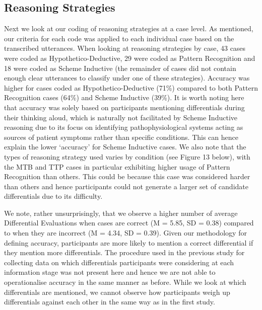 \documentclass[a4paper, nobind]{templates/ociamthesis}
\begin{document}
\hypertarget{reasoning-strategies}{%
\subsection*{Reasoning Strategies}\label{reasoning-strategies}}

Next we look at our coding of reasoning strategies at a case level. As mentioned, our criteria for each code was applied to each individual case based on the transcribed utterances. When looking at reasoning strategies by case, 43 cases were coded as Hypothetico-Deductive, 29 were coded as Pattern Recognition and 18 were coded as Scheme Inductive (the remainder of cases did not contain enough clear utterances to classify under one of these strategies). Accuracy was higher for cases coded as Hypothetico-Deductive (71\%) compared to both Pattern Recognition cases (64\%) and Scheme Inductive (39\%). It is worth noting here that accuracy was solely based on participants mentioning differentials during their thinking aloud, which is naturally not facilitated by Scheme Inductive reasoning due to its focus on identifying pathophysiological systems acting as sources of patient symptoms rather than specific conditions. This can hence explain the lower `accuracy' for Scheme Inductive cases. We also note that the types of reasoning strategy used varies by condition (see Figure 13 below), with the MTB and TTP cases in particular exhibiting higher usage of Pattern Recognition than others. This could be because this case was considered harder than others and hence participants could not generate a larger set of candidate differentials due to its difficulty.

We note, rather unsurprisingly, that we observe a higher number of average Differential Evaluations when cases are correct (M = 5.85, SD = 0.38) compared to when they are incorrect (M = 4.34, SD = 0.39). Given our methodology for defining accuracy, participants are more likely to mention a correct differential if they mention more differentials. The procedure used in the previous study for collecting data on which differentials participants were considering at each information stage was not present here and hence we are not able to operationalise accuracy in the same manner as before. While we look at which differentials are mentioned, we cannot observe how participants weigh up differentials against each other in the same way as in the first study.
\end{document}
